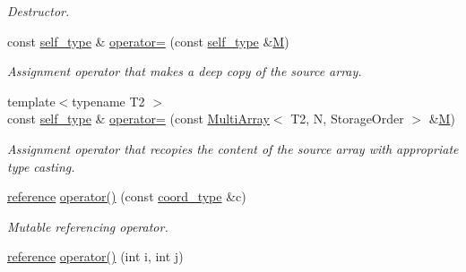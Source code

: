 \begin{DoxyCompactItemize}
\begin{DoxyCompactList}\small\item\em Destructor. \end{DoxyCompactList}\item 
\hypertarget{class_d_o_1_1_multi_array_a2dd14d78c32f3d83e2bb1aa428ff59f8}{const \hyperlink{class_d_o_1_1_multi_array}{self\-\_\-type} \& \hyperlink{class_d_o_1_1_multi_array_a2dd14d78c32f3d83e2bb1aa428ff59f8}{operator=} (const \hyperlink{class_d_o_1_1_multi_array}{self\-\_\-type} \&\hyperlink{struct_d_o_1_1_m}{M})}\label{class_d_o_1_1_multi_array_a2dd14d78c32f3d83e2bb1aa428ff59f8}

\begin{DoxyCompactList}\small\item\em Assignment operator that makes a deep copy of the source array. \end{DoxyCompactList}\item 
\hypertarget{class_d_o_1_1_multi_array_aeaf5648ec46dbd53a8818e3aed129068}{{\footnotesize template$<$typename T2 $>$ }\\const \hyperlink{class_d_o_1_1_multi_array}{self\-\_\-type} \& \hyperlink{class_d_o_1_1_multi_array_aeaf5648ec46dbd53a8818e3aed129068}{operator=} (const \hyperlink{class_d_o_1_1_multi_array}{Multi\-Array}$<$ T2, N, Storage\-Order $>$ \&\hyperlink{struct_d_o_1_1_m}{M})}\label{class_d_o_1_1_multi_array_aeaf5648ec46dbd53a8818e3aed129068}

\begin{DoxyCompactList}\small\item\em Assignment operator that recopies the content of the source array with appropriate type casting. \end{DoxyCompactList}\item 
\hypertarget{class_d_o_1_1_multi_array_af35032f9361f446260918b88401f0e6e}{\hyperlink{class_d_o_1_1_multi_array_a9b1a63f171d76a7a3995b6858e99f2ea}{reference} \hyperlink{class_d_o_1_1_multi_array_af35032f9361f446260918b88401f0e6e}{operator()} (const \hyperlink{class_d_o_1_1_multi_array_ae4fb477425bbeb20329d300396ac2582}{coord\-\_\-type} \&c)}\label{class_d_o_1_1_multi_array_af35032f9361f446260918b88401f0e6e}

\begin{DoxyCompactList}\small\item\em Mutable referencing operator. \end{DoxyCompactList}\item 
\hypertarget{class_d_o_1_1_multi_array_a07f8b52897f0d3f5835cef615d3a4ff0}{\hyperlink{class_d_o_1_1_multi_array_a9b1a63f171d76a7a3995b6858e99f2ea}{reference} \hyperlink{class_d_o_1_1_multi_array_a07f8b52897f0d3f5835cef615d3a4ff0}{operator()} (int i, int j)}\label{class_d_o_1_1_multi_array_a07f8b52897f0d3f5835cef615d3a4ff0}


\end{DoxyCompactItemize}
